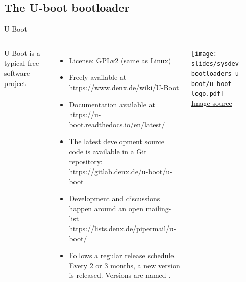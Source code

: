 \subsection{The U-boot bootloader}

\begin{frame}{U-Boot}
  \begin{columns}
      U-Boot is a typical free software project
      \begin{itemize}
      \item License: GPLv2 (same as Linux)
      \item Freely available at \url{https://www.denx.de/wiki/U-Boot}
      \item Documentation available at
        \url{https://u-boot.readthedocs.io/en/latest/}
      \item The latest development source code is available in a Git
        repository:
        \url{https://gitlab.denx.de/u-boot/u-boot}
      \item Development and discussions happen around an open mailing-list
        \url{https://lists.denx.de/pipermail/u-boot/}
      \item Follows a regular release schedule. Every 2 or 3 months,
        a new version is released. Versions are named .
      \end{itemize}
    \texttt{[image: slides/sysdev-bootloaders-u-boot/u-boot-logo.pdf]}\\
    {\tiny \href{https://en.wikipedia.org/wiki/Das_U-Boot\#/media/File:U-Boot_Logo.svg}{Image source}}
  \end{columns}
\end{frame}

